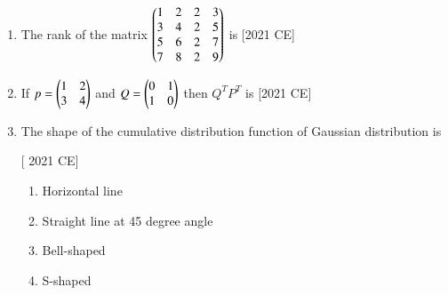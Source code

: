 \documentclass[journal]{IEEEtran}
\begin{document}
\begin{enumerate}
\begin{enumerate}
\end{enumerate}
\item The rank of the matrix $\begin{pmatrix}1 & 2 & 2 & 3 \\ 3 & 4 & 2 & 5 \\ 5 & 6 & 2 & 7 \\ 7 & 8 & 2 & 9\end{pmatrix}$ is \hfill [2021 CE]
\begin{enumerate}
\end{enumerate}
\item If $p = \begin{pmatrix}1 & 2 \\ 3 &4\end{pmatrix}$ and $Q = \begin{pmatrix}0 & 1 \\ 1 & 0\end{pmatrix}$ then $Q^TP^T$ is \hfill [2021 CE]
\begin{enumerate}
\end{enumerate}
\item The shape of the cumulative distribution function of Gaussian distribution is 

\hfill [ 2021 CE]
\begin{enumerate}
    \item Horizontal line
    \item Straight line at 45 degree angle
    \item Bell-shaped
    \item S-shaped
\end{enumerate}
\end{enumerate}
\end{document}

